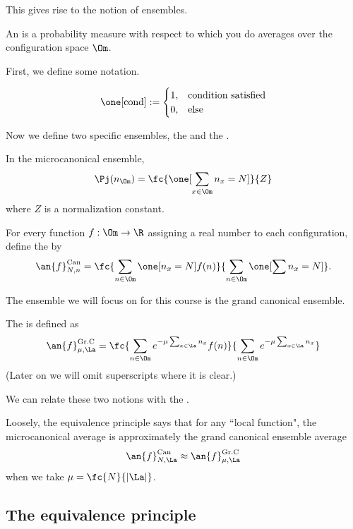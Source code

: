 This gives rise to the notion of ensembles. 
\begin{df}[Ensemble]
An  is a probability measure with respect to which you do averages over the configuration space $\Om$. 
\end{df} 
First, we define some notation.
\begin{df}
\[
\one[\text{cond}] := \begin{cases}
1,&\text{condition satisfied}\\
0,&\text{else}
\end{cases}
\]
\end{df}
Now we define two specific ensembles, the  and the . 

\begin{df}
In the microcanonical ensemble,
\[
\Pj(n_{\Om})= \fc{\one[\sum_{x\in \Om}n_x=N]}{Z}
\]
where $Z$ is a normalization constant.

For every function $f:\Om\to \R$ assigning a real number to each configuration, define the  by
\[
\an{f}_{N,n}^{\text{Can}} = \fc{\sum_{n\in \Om} \one[n_x=N] f(n)}{\sum_{n\in \Om} \one[\sum n_x=N]}.
\]
\end{df}
The ensemble we will focus on for this course is the grand canonical ensemble. 

\begin{df}
The  is defined as
\[
\an{f}_{\mu, \La}^{\text{Gr.C}} = \fc{\sum_{n\in \Om} e^{-\mu  \sum_{x\in \La}n_x}f(n)}{\sum_{n\in \Om}e^{-\mu \sum_{x\in \La} n_x}}
\]
(Later on we will omit superscripts where it is clear.)
\end{df}

We can relate these two notions with the . 

\begin{df}
Loosely, the equivalence principle says that for any ``local function", the microcanonical average is approximately the grand canonical ensemble average
\[
\an{f}_{N,\La}^{\text{Can}}\approx \an{f}_{\mu, \La}^{\text{Gr.C}}
\] 
when we take $\mu = \fc{N}{|\La|}$.
\end{df}


\subsection{The equivalence principle}

